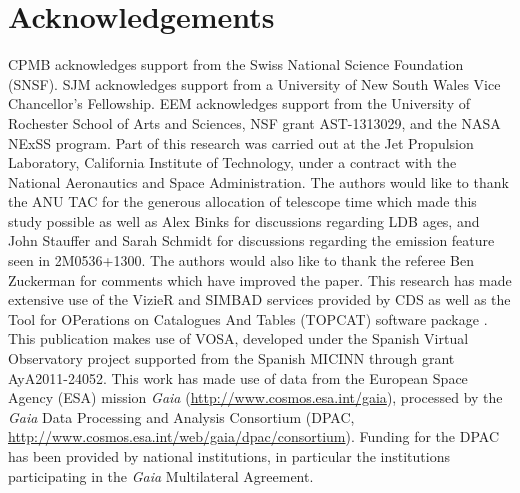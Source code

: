 \documentclass[usenatbib]{mnras}
\begin{document}
\section*{Acknowledgements}
CPMB acknowledges support from the Swiss National Science Foundation
(SNSF).
%
SJM acknowledges support from a University of New South Wales Vice
Chancellor's Fellowship.
%
EEM acknowledges support from the University of Rochester School of
Arts and Sciences, NSF grant AST-1313029, and the NASA NExSS program.
%
Part of this research was carried out at the Jet Propulsion
Laboratory, California Institute of Technology, under a contract with
the National Aeronautics and Space Administration.
%
The authors would like to thank the ANU TAC for the generous
allocation of telescope time which made this study possible as well as
Alex Binks for discussions regarding LDB ages, and John Stauffer and 
Sarah Schmidt for discussions regarding the emission feature seen in 2M0536+1300.
The authors would also like to thank the referee Ben Zuckerman for comments
which have improved the paper.
%
This research has made extensive use of the VizieR and SIMBAD services
provided by CDS as well as the Tool for OPerations on Catalogues And
Tables (TOPCAT) software package \citep{Taylor05}.
%
This publication makes use of VOSA, developed under the Spanish
Virtual Observatory project supported from the Spanish MICINN through
grant AyA2011-24052.
%
This work has made use of data from the European Space Agency (ESA)
mission {\it Gaia} (\url{http://www.cosmos.esa.int/gaia}), processed
by the {\it Gaia} Data Processing and Analysis Consortium (DPAC,
\url{http://www.cosmos.esa.int/web/gaia/dpac/consortium}).
%
Funding for the DPAC has been provided by national institutions, in
particular the institutions participating in the {\it Gaia}
Multilateral Agreement.



\end{document}
